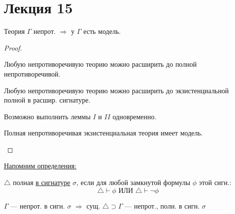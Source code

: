 \section{Лекция 15}
\begin{theorem}
\label{th:Gedel_fullness}
Теория $\Gamma$ непрот. $\Rightarrow$ у $\Gamma$ есть модель.
\end{theorem}
\begin{proof}
\begin{lemma}[I]
 Любую непротиворечивую теорию можно расширить до полной непротиворечивой.
\end{lemma}
\begin{lemma}[II]
 Любую непротиворечивую теорию можно расширить до экзистенциальной полной в расшир. сигнатуре.
\end{lemma}
\begin{lemma}[III]
Возможно выполнить леммы $I$ и $II$ одновременно.
\end{lemma}
\begin{lemma}[IV]
Полная непротиворечивая экзистенциальная теория имеет модель.
\end{lemma}
\end{proof}
\underline{Напомним определения:}
\begin{definition}
$\triangle$ полная \underline{в сигнатуре} $\sigma$, если для любой замкнутой формулы $\phi$ этой сигн.:
\[
  \triangle \vdash \phi \text{ ИЛИ } \triangle \vdash \neg\phi 
\]
\end{definition}
\begin{lemma}[I]
  $\Gamma$ --- непрот. в сигн. $\sigma$ $\Rightarrow$ сущ. $\triangle \supset \Gamma$ --- непрот., полн. в сигн. $\sigma$
\end{lemma}
